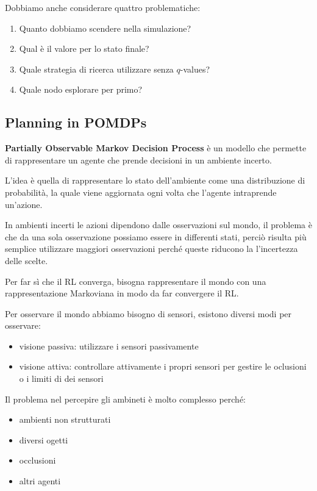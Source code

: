 Dobbiamo anche considerare quattro problematiche:
\begin{enumerate}
    \item Quanto dobbiamo scendere nella simulazione?
    \item Qual è il valore per lo stato finale?
    \item Quale strategia di ricerca utilizzare senza $q$-values?
    \item Quale nodo esplorare per primo?
\end{enumerate}
\subsection{Planning in POMDPs}
\textbf{Partially Observable Markov Decision Process} è un modello che permette di
rappresentare un agente che prende decisioni in un ambiente incerto. 

L'idea è quella di rappresentare lo stato dell'ambiente come una distribuzione di
probabilità, la quale viene aggiornata ogni volta che l'agente intraprende un'azione.




In ambienti incerti le azioni dipendono dalle osservazioni sul mondo, il problema è
che da una sola osservazione possiamo essere in differenti stati, perciò
risulta più semplice utilizzare maggiori osservazioni perché queste riducono la 
l'incertezza delle scelte.

Per far sì che il RL converga, bisogna rappresentare il mondo con una rappresentazione 
Markoviana in modo da far convergere il RL.

Per osservare il mondo abbiamo bisogno di sensori, esistono diversi modi per osservare:
\begin{itemize}
    \item visione passiva: utilizzare i sensori passivamente
    \item visione attiva: controllare attivamente i propri sensori per gestire le
    oclusioni o i limiti di dei sensori
\end{itemize}

Il problema nel percepire gli ambineti è molto complesso perché:
\begin{itemize}
    \item ambienti non strutturati
    \item diversi ogetti
    \item occlusioni
    \item altri agenti 
\end{itemize}

